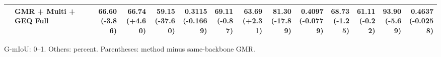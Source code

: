 \documentclass{article}
\begin{document}
{\begin{tabular}{llrrrrrrrrrrrr}
 & GMR + Multi + GEQ Full & \shortstack{66.60 \\ {\scriptsize\textcolor{Loss}{(-3.86)}}} & \shortstack{66.74 \\ {\scriptsize\textcolor{Gain}{(+4.60)}}} & \shortstack{59.15 \\ {\scriptsize\textcolor{Loss}{(-37.60)}}} & \shortstack{0.3115 \\ {\scriptsize\textcolor{Loss}{(-0.1669)}}} & \shortstack{69.11 \\ {\scriptsize\textcolor{Loss}{(-0.87)}}} & \shortstack{63.69 \\ {\scriptsize\textcolor{Gain}{(+2.31)}}} & \shortstack{81.30 \\ {\scriptsize\textcolor{Loss}{(-17.89)}}} & \shortstack{0.4097 \\ {\scriptsize\textcolor{Loss}{(-0.0779)}}} & \shortstack{68.73 \\ {\scriptsize\textcolor{Loss}{(-1.25)}}} & \shortstack{61.11 \\ {\scriptsize\textcolor{Loss}{(-0.22)}}} & \shortstack{93.90 \\ {\scriptsize\textcolor{Loss}{(-5.69)}}} & \shortstack{0.4637 \\ {\scriptsize\textcolor{Loss}{(-0.0258)}}} \\
\bottomrule\end{tabular}}\par
G-mIoU: 0--1. Others: percent. Parentheses: method minus same-backbone GMR.\par
\end{document}
